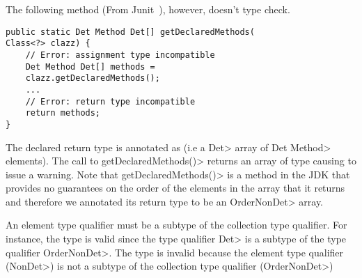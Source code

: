 The following method (From Junit~\cite{junit}), however, doesn't type check.
\begin{Verbatim}
public static Det Method Det[] getDeclaredMethods(
Class<?> clazz) {
    // Error: assignment type incompatible
    Det Method Det[] methods = 
    clazz.getDeclaredMethods();
    ...
    // Error: return type incompatible
    return methods;
}
\end{Verbatim}
The declared return type is annotated as  (i.e a \<Det> array of \<Det Method> elements).
The call to \<getDeclaredMethods()> returns an array of type 
causing \theDeterminismChecker to issue a warning.
Note that \<getDeclaredMethods()> is a method in the JDK that provides no guarantees on the order of
the elements in the array that it returns and therefore we annotated its return type
to be an \<OrderNonDet> array.

An element type qualifier must be a subtype of the collection type qualifier.
For instance, the type  is valid since the type qualifier
\<Det> is a subtype of the type qualifier \<OrderNonDet>.
The type  is invalid because the element type qualifier (\<NonDet>) is not a subtype of the collection type qualifier (\<OrderNonDet>)



